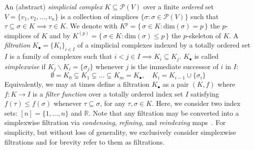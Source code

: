 An (abstract) \emph{simplicial complex} $K \subseteq \mathcal{P}(V)$ over a finite \emph{ordered} set $V = \{v_1, v_2, \dots, v_n \}$ is a collection of simplices $\{\sigma : \sigma \in \mathcal{P}(V) \}$ such that $\tau \subseteq \sigma \in K \implies \tau \in K$.
We denote with $K^p = \{ \, \sigma \in K : \mathrm{dim}(\sigma) = p \, \}$ the $p$-simplices of $K$ and by $K^{(p)} = \{ \, \sigma \in K : \mathrm{dim}(\sigma) \leq p \, \}$ the $p$-skeleton of $K$. 
A \emph{filtration} $K_\bullet = \{K_i\}_{i\in I}$ of a simplicial complexes indexed by a totally ordered set $I$ is a family of complexes such that $i< j \in I \implies K_i \subseteq K_j$. $K_\bullet$ is called \emph{simplexwise} if $K_j \smallsetminus K_i = \{\sigma_j\}$ whenever $j$ is the immediate successor of $i$ in $I$:
\begin{equation}
	\emptyset = K_0 \subsetneq K_1 \subsetneq \dots \subsetneq K_m  = K_\bullet, \quad K_i  = K_{i-1} \cup \{\sigma_i\}
\end{equation} 
Equivalently, we may at times define a filtration $K_\bullet$ as a pair $(K, f)$ where $f : K \to I$ is a \emph{filter function} over a totally ordered index set $I$ satisfying $f(\tau) \leq f(\sigma)$ whenever $\tau \subseteq \sigma$, for any $\tau,\sigma \in K$. Here, we consider two index sets: $[n] = \{ 1, \dots, n\}$ and $\mathbb{R}$. 
Note that any filtration may be converted into a simplexwise filtration via \emph{condensing}, \emph{refining}, and \emph{reindexing} maps~\cite{bauer2021ripser}. For simplicity, but without loss of generality, we exclusively consider simplexwise filtrations and for brevity refer to them as filtrations.
